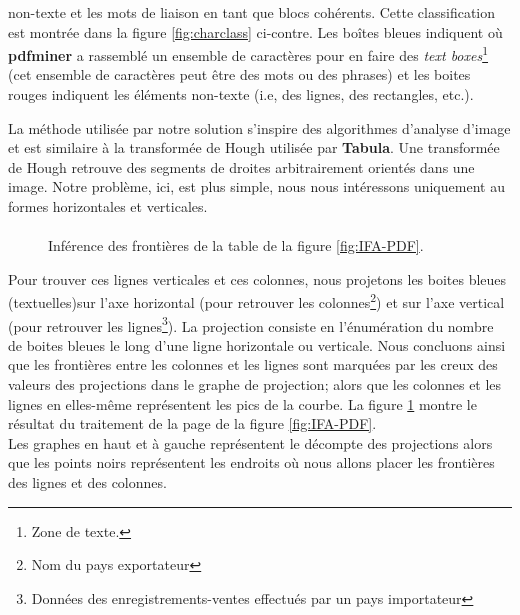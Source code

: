 		 non-texte et les mots de liaison en tant que blocs cohérents. Cette classification est montrée dans la figure \ref{fig:charclass} ci-contre. Les boîtes bleues indiquent où \textbf{pdfminer} a rassemblé un ensemble de caractères pour en faire des \textit{text boxes}\footnote{Zone de texte.} (cet ensemble de caractères peut être des mots ou des phrases) et les boites rouges indiquent les éléments non-texte (i.e, des lignes, des rectangles, etc.).
	\par
	La méthode utilisée par notre solution s'inspire des algorithmes d'analyse d'image et est similaire à la transformée de Hough utilisée par \textbf{Tabula}. Une transformée de Hough retrouve des segments de droites arbitrairement orientés dans une image. Notre problème, ici, est plus simple, nous nous intéressons uniquement au formes horizontales et verticales.
	\paragraph{}
	\begin{figure}
							\centering			    		
							\caption{Inférence des frontières de la table de la figure \ref{fig:IFA-PDF}.}
							\label{fig:projplot}
						\end{figure}
	Pour trouver ces lignes verticales et ces colonnes, nous projetons les boites bleues (textuelles)sur l'axe horizontal (pour retrouver les colonnes\footnote{Nom du pays exportateur}) et sur l'axe vertical (pour retrouver les lignes\footnote{Données des enregistrements-ventes effectués par un pays importateur }). La projection consiste en l'énumération du nombre de boites bleues le long d'une ligne horizontale ou verticale. Nous concluons ainsi que les frontières entre les colonnes et les lignes sont marquées par les creux des valeurs des projections dans le graphe de projection; alors que les colonnes et les lignes en elles-même représentent les pics de la courbe. La figure \ref{fig:projplot} montre le résultat du traitement de la page de la figure \ref{fig:IFA-PDF}.\\Les graphes en haut et à gauche représentent le décompte des projections alors que les points noirs représentent les endroits où nous allons placer les frontières des lignes et des colonnes.
